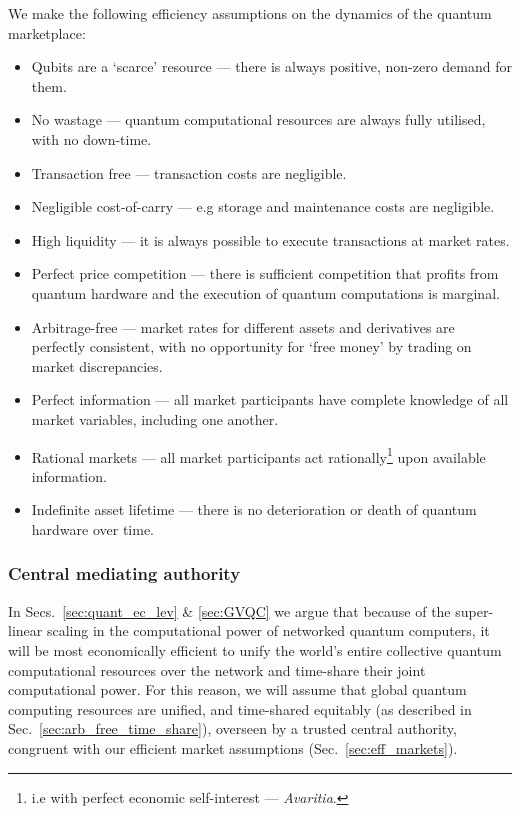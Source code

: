 \begin{postulate}\label{post:market_eff} We make the following efficiency assumptions on the dynamics of the quantum marketplace:
\begin{itemize}
	\item Qubits are a `scarce' resource --- there is always positive, non-zero demand for them.
	\item No wastage --- quantum computational resources are always fully utilised, with no down-time.
	\item Transaction free --- transaction costs are negligible.
	\item Negligible cost-of-carry --- e.g storage and maintenance costs are negligible.
	\item High liquidity --- it is always possible to execute transactions at market rates.
	\item Perfect price competition --- there is sufficient competition that profits from quantum hardware and the execution of quantum computations is marginal.
	\item Arbitrage-free --- market rates for different assets and derivatives are perfectly consistent, with no opportunity for `free money' by trading on market discrepancies.
	\item Perfect information --- all market participants have complete knowledge of all market variables, including one another.
	\item Rational markets --- all market participants act rationally\footnote{i.e with perfect economic self-interest --- \textit{Avaritia}.} upon available information.
	\item Indefinite asset lifetime --- there is no deterioration or death of quantum hardware over time.
\end{itemize}
\end{postulate}

%
%

\subsubsection{Central mediating authority}

In Secs.~\ref{sec:quant_ec_lev} \& \ref{sec:GVQC} we argue that because of the super-linear scaling in the computational power of networked quantum computers, it will be most economically efficient to unify the world's entire collective quantum computational resources over the network and time-share their joint computational power. For this reason, we will assume that global quantum computing resources are unified, and time-shared equitably (as described in Sec.~\ref{sec:arb_free_time_share}), overseen by a trusted central authority, congruent with our efficient market assumptions (Sec.~\ref{sec:eff_markets}).

